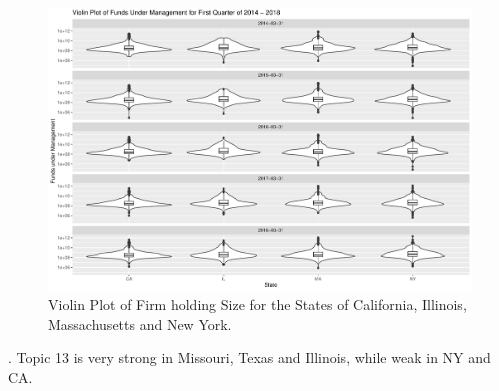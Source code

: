 \begin{figure}
	\centering
	\includegraphics[width=1\linewidth]{Figures/ChapterV/Violinplot_q1}
	\caption[Violin Plot of Firm holding Size for CA, IL, MA and NY.]{Violin Plot of Firm holding Size for the States of California, Illinois, Massachusetts and New York.}
	\label{fig:violinplotq1}
\end{figure}


.   
Topic 13 is very strong in Missouri, Texas and Illinois, while weak in NY and CA.
